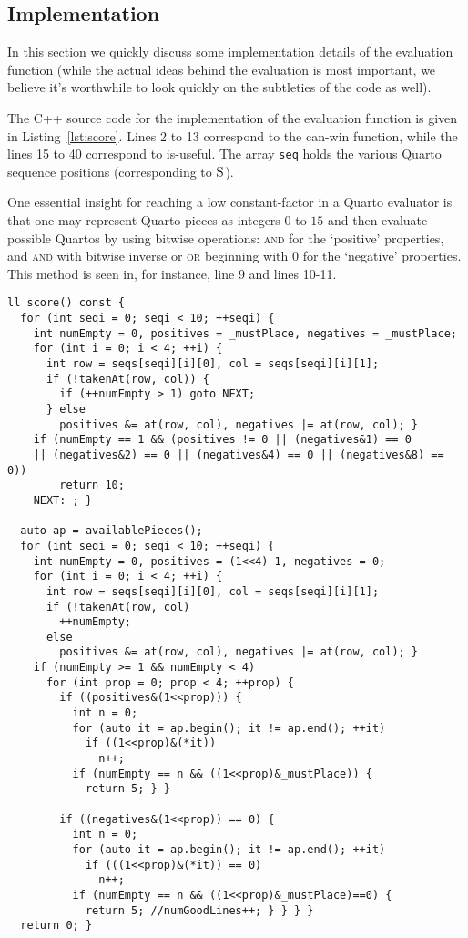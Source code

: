 \documentclass[a4paper,9pt]{article}
\begin{document}
\subsection{Implementation}
\label{sec:implementation}

In this section we quickly discuss some implementation details of the
evaluation function (while the actual ideas behind the evaluation is most
important, we believe it's worthwhile to look quickly on the subtleties of the
code as well).  

The C++ source code for the implementation of the evaluation function is given
in Listing~\ref{lst:score}. Lines 2 to 13 correspond to the \textsf{can-win}
function, while the lines 15 to 40 correspond to \textsf{is-useful}.  The array
\texttt{seq} holds the various Quarto sequence positions (corresponding to
$\textsc{S}$). 

One essential insight for reaching a low constant-factor in a Quarto evaluator
is that one may represent Quarto pieces as integers $0$ to $15$ and then
evaluate possible Quartos by using bitwise operations: \textsc{and} for the
`positive' properties, and \textsc{and} with bitwise inverse or \textsc{or}
beginning with $0$ for the `negative' properties. This method is seen in, for
instance, line 9 and lines 10-11.

\begin{lstlisting}[label=lst:score,caption=Scoring procedure]
ll score() const {
  for (int seqi = 0; seqi < 10; ++seqi) {
    int numEmpty = 0, positives = _mustPlace, negatives = _mustPlace;
    for (int i = 0; i < 4; ++i) {
      int row = seqs[seqi][i][0], col = seqs[seqi][i][1];
      if (!takenAt(row, col)) {
        if (++numEmpty > 1) goto NEXT;
      } else 
        positives &= at(row, col), negatives |= at(row, col); }
    if (numEmpty == 1 && (positives != 0 || (negatives&1) == 0 
    || (negatives&2) == 0 || (negatives&4) == 0 || (negatives&8) == 0))
        return 10;
    NEXT: ; }

  auto ap = availablePieces();
  for (int seqi = 0; seqi < 10; ++seqi) {
    int numEmpty = 0, positives = (1<<4)-1, negatives = 0;
    for (int i = 0; i < 4; ++i) {
      int row = seqs[seqi][i][0], col = seqs[seqi][i][1];
      if (!takenAt(row, col) 
        ++numEmpty;
      else 
        positives &= at(row, col), negatives |= at(row, col); }
    if (numEmpty >= 1 && numEmpty < 4) 
      for (int prop = 0; prop < 4; ++prop) {
        if ((positives&(1<<prop))) {
          int n = 0;
          for (auto it = ap.begin(); it != ap.end(); ++it) 
            if ((1<<prop)&(*it))
              n++;
          if (numEmpty == n && ((1<<prop)&_mustPlace)) {
            return 5; } }

        if ((negatives&(1<<prop)) == 0) {
          int n = 0;
          for (auto it = ap.begin(); it != ap.end(); ++it) 
            if (((1<<prop)&(*it)) == 0)
              n++;
          if (numEmpty == n && ((1<<prop)&_mustPlace)==0) {
            return 5; //numGoodLines++; } } } }
  return 0; }
\end{lstlisting}
\end{document}
